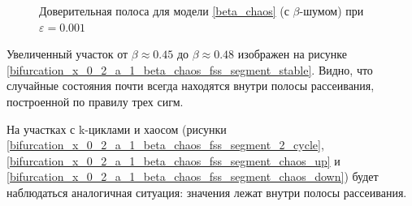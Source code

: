 \begin{figure}
            
        \caption{Доверительная полоса для модели \ref{beta_chaos} (с \(\beta\)-шумом) при \(\varepsilon = 0.001\)}
    \end{figure}

    Увеличенный участок от \(\beta \approx 0.45\) до \(\beta \approx 0.48\) изображен на рисунке \ref{bifurcation_x_0_2_a_1_beta_chaos_fss_segment_stable}. Видно, что случайные состояния почти всегда находятся внутри полосы рассеивания, построенной по правилу трех сигм. 

    На участках с k-циклами и хаосом (рисунки \ref{bifurcation_x_0_2_a_1_beta_chaos_fss_segment_2_cycle}, \ref{bifurcation_x_0_2_a_1_beta_chaos_fss_segment_chaos_up} и \ref{bifurcation_x_0_2_a_1_beta_chaos_fss_segment_chaos_down}) будет наблюдаться аналогичная ситуация: значения лежат внутри полосы рассеивания.

